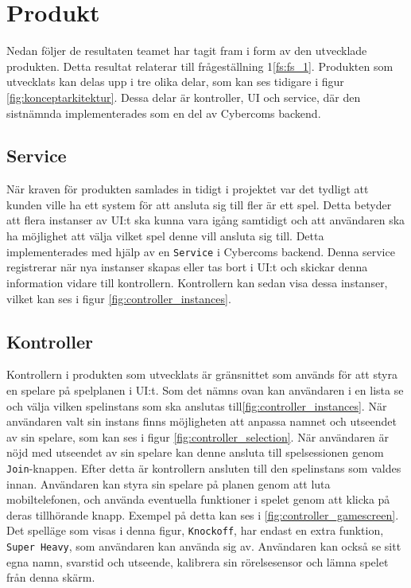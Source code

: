 \section{Produkt}
Nedan följer de resultaten teamet har tagit fram i form av den utvecklade produkten. Detta resultat relaterar till frågeställning 1\ref{fs:fs_1}. Produkten som utvecklats kan delas upp i tre olika delar, som kan ses tidigare i figur \ref{fig:konceptarkitektur}. Dessa delar är kontroller, UI och service, där den sistnämnda implementerades som en del av Cybercoms backend.


\subsection{Service}
När kraven för produkten samlades in tidigt i projektet var det tydligt att kunden ville ha ett system för att ansluta sig till fler är ett spel. Detta betyder att flera instanser av UI:t ska kunna vara igång samtidigt och att användaren ska ha möjlighet att välja vilket spel denne vill ansluta sig till. Detta implementerades med hjälp av en \texttt{Service} i Cybercoms backend. Denna service registrerar när nya instanser skapas eller tas bort i UI:t och skickar denna information vidare till kontrollern. Kontrollern kan sedan visa dessa instanser, vilket kan ses i figur \ref{fig:controller_instances}.

\subsection{Kontroller}
Kontrollern i produkten som utvecklats är gränsnittet som används för att styra en spelare på spelplanen i UI:t. Som det nämns ovan kan användaren i en lista se och välja vilken spelinstans som ska anslutas till\ref{fig:controller_instances}. När användaren valt sin instans finns möjligheten att anpassa namnet och utseendet av sin spelare, som kan ses i figur \ref{fig:controller_selection}. När användaren är nöjd med utseendet av sin spelare kan denne ansluta till spelsessionen genom \texttt{Join}-knappen. Efter detta är kontrollern ansluten till den spelinstans som valdes innan. Användaren kan styra sin spelare på planen genom att luta mobiltelefonen, och använda eventuella funktioner i spelet genom att klicka på deras tillhörande knapp. Exempel på detta kan ses i \ref{fig:controller_gamescreen}. Det spelläge som visas i denna figur, \texttt{Knockoff}, har endast en extra funktion, \texttt{Super Heavy}, som användaren kan använda sig av. Användaren kan också se sitt egna namn, svarstid och utseende, kalibrera sin rörelsesensor och lämna spelet från denna skärm. 


